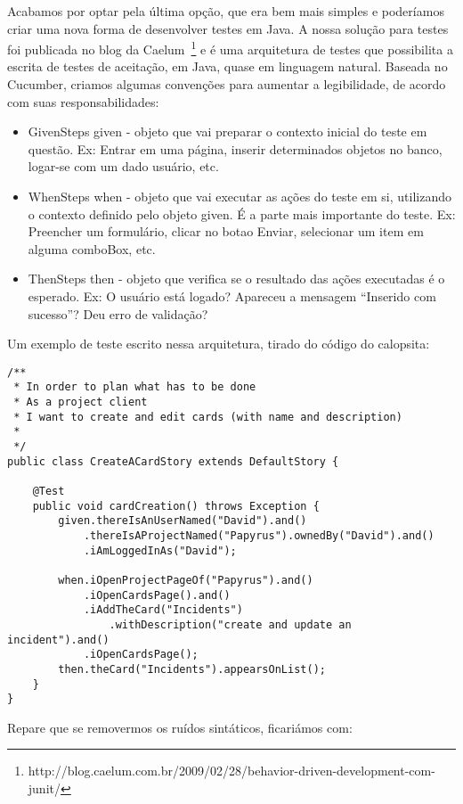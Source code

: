 Acabamos por optar pela última opção, que era bem mais simples e poderíamos criar uma nova forma de desenvolver 
testes em Java. A nossa solução para testes foi publicada no blog da Caelum~\footnote{http://blog.caelum.com.br/2009/02/28/behavior-driven-development-com-junit/} e é uma arquitetura de 
testes que possibilita a escrita de testes de aceitação, em Java, quase em linguagem natural. Baseada no Cucumber, criamos algumas convenções para aumentar a legibilidade, de acordo com suas responsabilidades:

\begin{itemize}
	\item{GivenSteps given - objeto que vai preparar o contexto inicial do teste em questão. Ex: Entrar em uma página, inserir determinados objetos no banco, logar-se com um dado usuário, etc.}
	\item{WhenSteps when - objeto que vai executar as ações do teste em si, utilizando o contexto definido pelo objeto given. É a parte mais importante do teste. Ex: Preencher um formulário, clicar no botao Enviar, selecionar um item em alguma comboBox, etc.}
	\item{ThenSteps then - objeto que verifica se o resultado das ações executadas é o esperado. Ex: O usuário está logado? Apareceu a mensagem ``Inserido com sucesso''? Deu erro de validação?}
\end{itemize}

Um exemplo de teste escrito nessa arquitetura, tirado do código do calopsita:

\begin{lstlisting}
/**
 * In order to plan what has to be done
 * As a project client
 * I want to create and edit cards (with name and description)
 *
 */
public class CreateACardStory extends DefaultStory {

	@Test
	public void cardCreation() throws Exception {
		given.thereIsAnUserNamed("David").and()
			.thereIsAProjectNamed("Papyrus").ownedBy("David").and()
			.iAmLoggedInAs("David");

		when.iOpenProjectPageOf("Papyrus").and()
		    .iOpenCardsPage().and()
			.iAddTheCard("Incidents")
				.withDescription("create and update an incident").and()
			.iOpenCardsPage();
		then.theCard("Incidents").appearsOnList();
	}
}
\end{lstlisting}

Repare que se removermos os ruídos sintáticos, ficariámos com:

